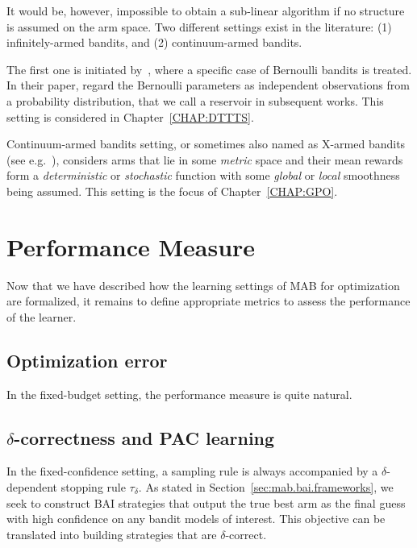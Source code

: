 It would be, however, impossible to obtain a sub-linear algorithm if no structure is assumed on the arm space. Two different settings exist in the literature: (1) \gls{infinitely-armed bandits}, and (2) \gls{continuum-armed bandits}. 

The first one is initiated by~\cite{berry1997infinite}, where a specific case of Bernoulli bandits is treated. In their paper, \cite{berry1997infinite} regard the Bernoulli parameters as independent observations from a probability distribution, that we call a \gls{reservoir} in subsequent works. This setting is considered in Chapter~\ref{CHAP:DTTTS}.

Continuum-armed bandits setting, or sometimes also named as \gls{X-armed bandits} (see e.g.~\citealt{bubeck2010x}), considers arms that lie in some \emph{metric} space and their mean rewards form a \emph{deterministic} or \emph{stochastic} function with some \emph{global} or \emph{local} smoothness being assumed. This setting is the focus of Chapter~\ref{CHAP:GPO}.

\section{Performance Measure}\label{sec:mab.performance}

Now that we have described how the learning settings of MAB for optimization are formalized, it remains to define appropriate metrics to assess the performance of the learner.

\subsection{Optimization error}\label{sec:mab.performance.optim}

In the fixed-budget setting, the performance measure is quite natural.

\subsection{$\delta$-correctness and PAC learning}\label{sec:mab.performance.pac}

In the fixed-confidence setting, a sampling rule is always accompanied by a $\delta$-dependent stopping rule $\tau_{\delta}$. As stated in Section~\ref{sec:mab.bai.frameworks}, we seek to construct BAI strategies that output the true best arm as the final guess with high confidence on any bandit models of interest. This objective can be translated into building strategies that are $\delta$-correct.

